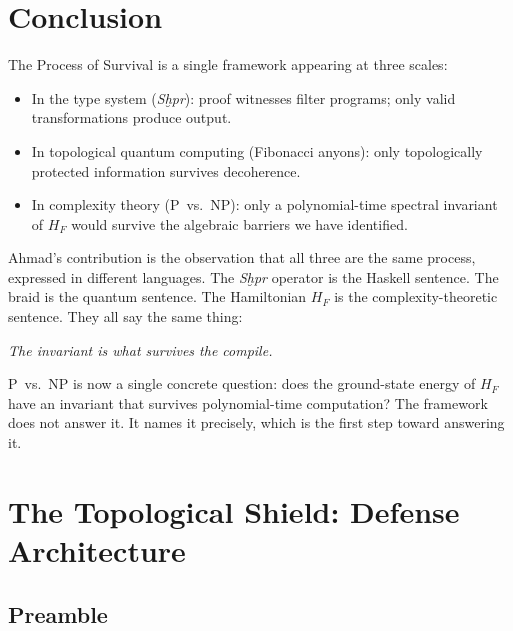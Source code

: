 \documentclass[11pt,letterpaper]{article}
\begin{document}
\section{Conclusion}
\label{sec:conclusion}

The Process of Survival is a single framework appearing at three scales:
\begin{itemize}[nosep]
\item In the type system (\textit{Sḫpr}): proof witnesses filter programs;
  only valid transformations produce output.
\item In topological quantum computing (Fibonacci anyons): only
  topologically protected information survives decoherence.
\item In complexity theory (P~vs.~NP): only a polynomial-time spectral
  invariant of $H_F$ would survive the algebraic barriers we have identified.
\end{itemize}

Ahmad's contribution is the observation that all three are the same process,
expressed in different languages.  The \textit{Sḫpr} operator is the Haskell
sentence.  The braid is the quantum sentence.  The Hamiltonian $H_F$ is the
complexity-theoretic sentence.  They all say the same thing:

\begin{center}
\emph{The invariant is what survives the compile.}
\end{center}

P~vs.~NP is now a single concrete question: does the ground-state energy of
$H_F$ have an invariant that survives polynomial-time computation?  The
framework does not answer it.  It names it precisely, which is the first
step toward answering it.

\appendix
\section{The Topological Shield: Defense Architecture}
\label{app:shield}

\subsection*{Preamble}
\end{document}
